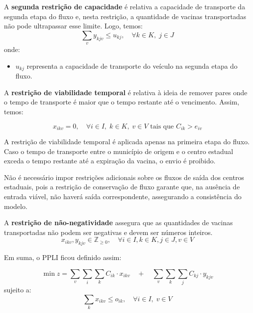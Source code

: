A \textbf{segunda restrição de capacidade} é relativa a capacidade de transporte da segunda etapa do fluxo e, nesta restrição, a quantidade de vacinas transportadas não pode ultrapassar esse limite. Logo, temos:
\begin{equation*}
\sum_{v} y_{kjv} \le u_{kj}, \quad \forall k \in K, \; j \in J
\end{equation*}
onde:
\begin{itemize}
    \item $u_{kj}$ representa a capacidade de transporte do veículo na segunda etapa do fluxo.
\end{itemize}

A \textbf{restrição de viabilidade temporal} é relativa à ideia de remover pares onde o tempo de transporte é maior que o tempo restante até o vencimento. Assim, temos:

\begin{equation*}
    x_{ikv} = 0, \quad \forall i \in I, \; k \in K, \; v \in V \text{ tais que } C_{ik} > e_{iv}
\end{equation*}

A restrição de viabilidade temporal é aplicada apenas na primeira etapa do fluxo. Caso o tempo de transporte entre o município de origem e o centro estadual exceda o tempo restante até a expiração da vacina, o envio é proibido.

Não é necessário impor restrições adicionais sobre os fluxos de saída dos centros estaduais, pois a restrição de conservação de fluxo garante que, na ausência de entrada viável, não haverá saída correspondente, assegurando a consistência do modelo.


A \textbf{restrição de não-negatividade} assegura que as quantidades de vacinas transportadas não podem ser negativas e devem ser números inteiros.
\begin{equation*}
x_{ikv}, y_{kjv} \in \mathbb{Z}_{\geq 0}, \quad \forall i \in I, k \in K, j \in J, v \in V
\end{equation*}

Em suma, o PPLI ficou definido assim:

\begin{equation*}
    \min z = \sum_{v} \sum_{i} \sum_{k} C_{ik} \cdot x_{ikv} \quad + \quad \sum_{v} \sum_{k} \sum_{j} C_{kj} \cdot y_{kjv}
\end{equation*}
sujeito a:
\begin{equation*}
\sum_{k} x_{ikv} \le o_{ik}, \quad \forall i \in I,\; v \in V
\end{equation*}

